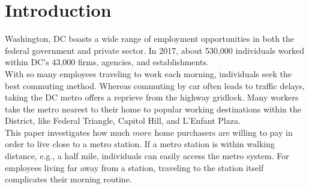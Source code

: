 \documentclass[12pt]{report}
\newcommand\tab[1][.60cm]{\hspace*{#1}}
\begin{document}
\section*{Introduction}
Washington, DC boasts a wide range of employment opportunities in both the federal government and private sector. In 2017, about 530,000 individuals worked within DC's 43,000 firms, agencies, and establishments.\\
\tab With so many employees traveling to work each morning, individuals seek the best commuting method. Whereas commuting by car often leads to traffic delays, taking the DC metro offers a reprieve from the highway gridlock. Many workers take the metro nearest to their home to popular working destinations within the District, like Federal Triangle, Capitol Hill, and L'Enfant Plaza.\\
\tab This paper investigates how much $more$ home purchasers are willing to pay in order to live close to a metro station. If a metro station is within walking distance, e.g., a half mile, individuals can easily access the metro system. For employees living far away from a station, traveling to the station itself complicates their morning routine. 
\end{document}
